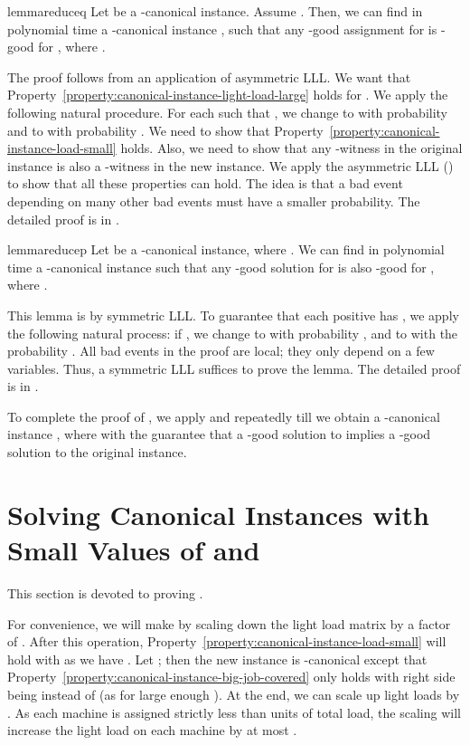 \documentclass[11pt]{article}
\newcounter{prop}
\begin{document}
\begin{restatable}{lemma}{reduceq}
\label{lemma:reduce-q}\label{lem:reduce-q}
 Let  be a -canonical instance. Assume .  Then, we can find in polynomial time a -canonical instance , such that any -good assignment  for  is -good for , where .
\end{restatable}

The proof follows from an application of asymmetric LLL. We want that Property~\ref{property:canonical-instance-light-load-large} holds for .  We apply the following natural procedure. For each  such that , we change  to  with probability  and to  with probability . We need to show that Property~\ref{property:canonical-instance-load-small} holds. Also, we need to show that any -witness in the original instance is also a -witness in the new instance. We apply the asymmetric LLL () to show that all these properties can hold.  The idea is that a bad event depending on many other bad events must have a smaller probability.  The detailed proof is in .

\begin{restatable}{lemma}{reducep}
\label{lemma:reduce-p}\label{lem:reduce-p}
 Let  be a -canonical instance, where .  We can find in polynomial time a -canonical instance  such that any -good solution  for  is also -good for , where .
\end{restatable}

This lemma is by symmetric LLL. To guarantee that each positive  has , we apply the following natural process: if , we change  to  with probability , and to  with the probability . All bad events in the proof are local; they only depend on a few variables.  Thus, a symmetric LLL suffices to prove the lemma. The detailed proof is in .

To complete the proof of , we apply  and  repeatedly till we obtain a -canonical instance , where 
with the guarantee that a -good solution to  implies a -good solution to the original instance. 

\section{Solving Canonical Instances with Small Values of \texorpdfstring{}{p} and \texorpdfstring{}{q}}
\label{sec:fixq}

This section is devoted to proving .
\smallpq*

\noindent For convenience, we will make  by scaling down the light load matrix  by a factor of . After this operation, Property~\ref{property:canonical-instance-load-small} will hold with  as we have . Let ; then the new instance is -canonical except that Property~\ref{property:canonical-instance-big-job-covered} only holds with right side being  instead of  (as  for large enough ).  At the end, we can scale up light loads by . As each machine is assigned strictly less than    units of total load, the scaling will increase the light load on each machine by at most .  
\end{document}
